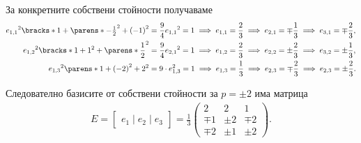 \documentclass{../../common/topic}
\begin{document}
\begin{solution}
  За конкретните собствени стойности получаваме
  \begin{align*}
    {e_{1,1}}^2 \bracks*{1 + {\parens*{ - \tfrac 1 2 }}^2 + {(-1)}^2 } &= \frac 9 4 {e_{1,1}}^2 = 1 \implies e_{1,1} = \frac 2 3 \implies e_{2,1} = \mp \frac 1 3 \implies e_{3,1} = \mp \frac 2 3,
    \\
    {e_{1,2}}^2 \bracks*{1 + 1^2 + {\parens*{ \frac 1 2 }}^2 } &= \frac 9 4 {e_{2,1}}^2 = 1 \implies e_{1,2} = \frac 2 3 \implies e_{2,2} = \pm \frac 2 3 \implies e_{3,2} = \pm \frac 1 3,
    \\
    {e_{1,3}}^2 \parens*{1 + {(-2)}^2 + 2^2 } &= 9 \cdot {e_{1,3}^2} = 1 \implies e_{1,3} = \frac 1 3 \implies e_{2,3} = \mp \frac 2 3 \implies e_{2,3} = \pm \frac 2 3.
  \end{align*}

  Следователно базисите от собствени стойности за \( p = \pm 2 \) има матрица
  \begin{align*}
    E = \begin{bmatrix} e_1 \mid e_2 \mid e_3 \end{bmatrix} = \frac 1 3 \begin{pmatrix}
          2 &     2 &     1 \\
      \mp 1 & \pm 2 & \mp 2 \\
      \mp 2 & \pm 1 & \pm 2
    \end{pmatrix}.
  \end{align*}


\end{solution}
\end{document}
